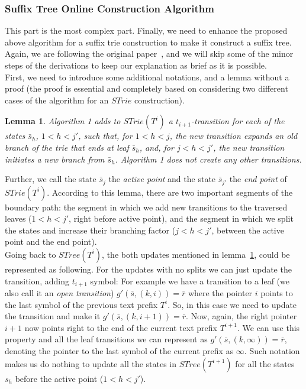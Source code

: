 \documentclass[paper=a4, fontsize=11pt]{scrartcl} %
\numberwithin{equation}{section} %
\numberwithin{figure}{section} %
\numberwithin{table}{section} %
\newtheorem{lemma}[theorem]{Lemma}
\begin{document}
\subsubsection{Suffix Tree Online Construction Algorithm}
This part is the most complex part. Finally, we need to enhance the proposed above algorithm for a suffix trie construction to make it construct a suffix tree. Again, we are following the original paper~\cite{ukkonen1995line}, and we will skip some of the minor steps of the derivations to keep our explanation as brief as it is possible.\\

First, we need to introduce some additional notations, and a lemma without a proof (the proof is essential and completely based on considering two different cases of the algorithm for an $STrie$ construction).

\begin{lemma}
\label{lemma:active-end-point}
Algorithm 1 adds to $STrie( T^i)$ a $t_{i+1}$-transition for each of the states $\bar{s}_h$,
$1 < h < j'$, such that, for $1 < h < j$, the new transition expands an old branch of
the trie that ends at leaf $\bar{s}_h$, and, for $j < h < j'$, the new transition initiates a new branch from $\bar{s}_h$. Algorithm 1 does not create any other transitions.
\end{lemma}

Further, we call the state $\bar{s}_j$ the \textit{active point} and the state $\bar{s}_{j'}$ the \textit{end point} of $STrie(T^i)$. According to this lemma, there are two important segments of the boundary path: the segment in which we add new transitions to the traversed leaves ($1 < h < j'$, right before active point), and the segment in which we split the states and increase their branching factor ($j < h < j'$, between the active point and the end point).\\

Going back to $STree(T^i)$, the both updates mentioned in lemma~\ref{lemma:active-end-point}, could be represented as following. For the updates with no splits we can just update the transition, adding $t_{i+1}$ symbol: For example we have a transition to a leaf (we also call it an \textit{open transition}) $g'(\bar{s}, (k, i)) = \bar{r}$ where the pointer $i$ points to the last symbol of the previous text prefix $T^i$. So, in this case we need to update the transition and make it $g'(\bar{s}, (k, i+1)) = \bar{r}$. Now, again, the right pointer $i+1$ now points right to the end of the current text prefix $T^{i+1}$. We can use this property and all the leaf transitions we can represent as $g'(\bar{s}, (k, \infty)) = \bar{r}$, denoting the pointer to the last symbol of the current prefix as $\infty$. Such notation makes us do nothing to update all the states in $STree(T^{i+1})$ for all the states $s_h$ before the active point ($1 < h < j'$).
\end{document}
